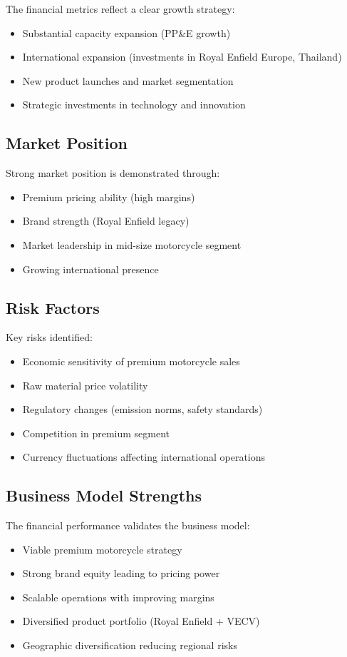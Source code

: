 \documentclass[8pt,a4paper]{article}
\begin{document}
The financial metrics reflect a clear growth strategy:
\begin{itemize}
    \item Substantial capacity expansion (PP\&E growth)
    \item International expansion (investments in Royal Enfield Europe, Thailand)
    \item New product launches and market segmentation
    \item Strategic investments in technology and innovation
\end{itemize}

\subsection{Market Position}

Strong market position is demonstrated through:
\begin{itemize}
    \item Premium pricing ability (high margins)
    \item Brand strength (Royal Enfield legacy)
    \item Market leadership in mid-size motorcycle segment
    \item Growing international presence
\end{itemize}

\subsection{Risk Factors}

Key risks identified:
\begin{itemize}
    \item Economic sensitivity of premium motorcycle sales
    \item Raw material price volatility
    \item Regulatory changes (emission norms, safety standards)
    \item Competition in premium segment
    \item Currency fluctuations affecting international operations
\end{itemize}

\subsection{Business Model Strengths}

The financial performance validates the business model:
\begin{itemize}
    \item Viable premium motorcycle strategy
    \item Strong brand equity leading to pricing power
    \item Scalable operations with improving margins
    \item Diversified product portfolio (Royal Enfield + VECV)
    \item Geographic diversification reducing regional risks
\end{itemize}
\end{document}
